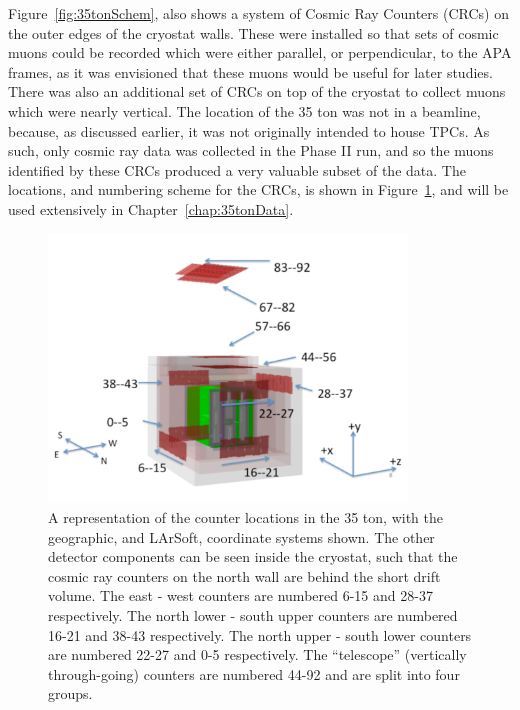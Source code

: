 Figure~\ref{fig:35tonSchem}, also shows a system of Cosmic Ray Counters (CRCs) on the outer edges of the cryostat walls. These were installed so that sets of cosmic muons could be recorded which were either parallel, or perpendicular, to the APA frames, as it was envisioned that these muons would be useful for later studies. There was also an additional set of CRCs on top of the cryostat to collect muons which were nearly vertical. The location of the 35 ton was not in a beamline, because, as discussed earlier, it was not originally intended to house TPCs. As such, only cosmic ray data was collected in the Phase II run, and so the muons identified by these CRCs produced a very valuable subset of the data. The locations, and numbering scheme for the CRCs, is shown in Figure~\ref{fig:35tonCounterLoc}, and will be used extensively in Chapter~\ref{chap:35tonData}. \\

\begin{figure}
  \centering
  \includegraphics[width=0.85\textwidth]{35tonFullDetect}
  \caption[A representation of the counter locations in the 35 ton]
          {A representation of the counter locations in the 35 ton, with the geographic, and LArSoft, coordinate systems shown. The other detector components can be seen inside the cryostat, such that the cosmic ray counters on the north wall are behind the short drift volume. The east - west counters are numbered 6-15 and 28-37 respectively. The north lower - south upper counters are numbered 16-21 and 38-43 respectively. The north upper - south lower counters are numbered 22-27 and 0-5 respectively. The ``telescope'' (vertically through-going) counters are numbered 44-92 and are split into four groups.}
  \label{fig:35tonCounterLoc}
\end{figure}

